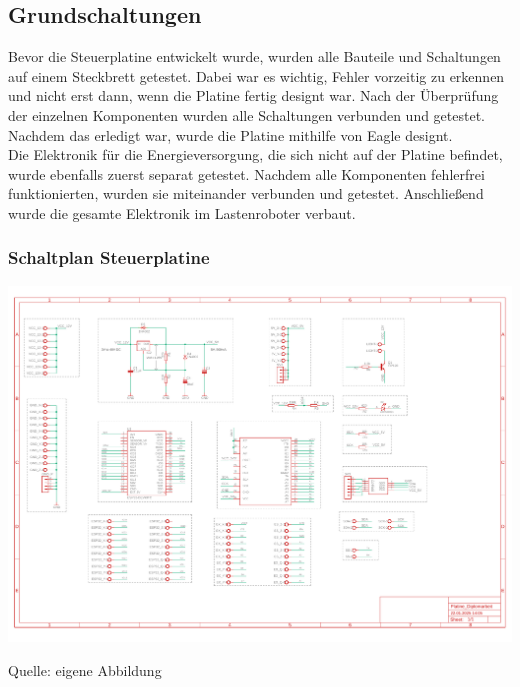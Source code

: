 \documentclass[ngerman,12pt,a4paper]{article}
\begin{document}
		\subsection{Grundschaltungen} %
		
		Bevor die Steuerplatine entwickelt wurde, wurden alle Bauteile und Schaltungen auf einem Steckbrett getestet. Dabei war es wichtig, Fehler vorzeitig zu erkennen und nicht erst dann, wenn die Platine fertig designt war. Nach der Überprüfung der einzelnen Komponenten wurden alle Schaltungen verbunden und getestet. Nachdem das erledigt war, wurde die Platine mithilfe von Eagle designt. \\[0.5cm]
		Die Elektronik für die Energieversorgung, die sich nicht auf der Platine befindet, wurde ebenfalls zuerst separat getestet. Nachdem alle Komponenten fehlerfrei funktionierten, wurden sie miteinander verbunden und getestet. Anschließend wurde die gesamte Elektronik im Lastenroboter verbaut.
		
			\subsubsection{Schaltplan Steuerplatine}
			
		\begin{center} 
			\begin{minipage}[t]{\textwidth}
				\includegraphics[angle=90, scale=0.7]{Pictures/Steuerplatine.pdf}
				\label{fig: Schaltplan Steuerplatine}
				\vspace{-10pt}
				\begin{center}
					\par\small Quelle: eigene Abbildung
				\end{center}
			\end{minipage} \\[0.75cm]
		\end{center}
			
\end{document}
